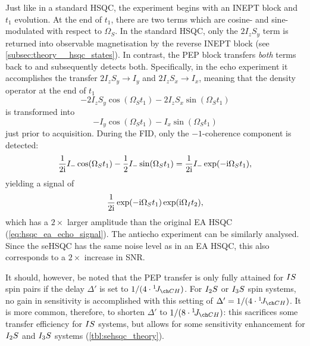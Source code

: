 Just like in a standard HSQC, the experiment begins with an INEPT block and $t_1$ evolution.
At the end of $t_1$, there are two terms which are cosine- and sine-modulated with respect to $\Omega_S$.
In the standard HSQC, only the $2I_zS_y$ term is returned into observable \proton{} magnetisation by the reverse INEPT block (see \cref{subsec:theory__hsqc_states}).
In contrast, the PEP block transfers \textit{both} terms back to \proton{} and subsequently detects both.
Specifically, in the echo experiment it accomplishes the transfer $2I_zS_y \to I_y$ and $2I_zS_x \to I_x$, meaning that the density operator at the end of $t_1$
\begin{equation}
    \label{eq:sehsqc_t1_modulation}
    -2I_zS_y \cos(\Omega_S t_1) - 2I_zS_x \sin(\Omega_S t_1)
\end{equation}
is transformed into
\begin{equation}
    \label{eq:sehsqc_before_detection}
    -I_y \cos(\Omega_S t_1) - I_x \sin(\Omega_S t_1)
\end{equation}
just prior to acquisition.
During the FID, only the $-1$-coherence component is detected:
\begin{equation}
    \label{eq:sehsqc_detection_minusone}
    \frac{1}{2\mathrm{i}}I_- \cos(\Omega_S t_1) - \frac{1}{2}I_- \sin(\Omega_S t_1) = \frac{1}{2\mathrm{i}}I_-\exp(-\mathrm{i} \Omega_S t_1),
\end{equation}
yielding a signal of
\begin{equation}
    \label{eq:s_echo_sehsqc}
    \frac{1}{2\mathrm{i}}\exp(-\mathrm{i} \Omega_S t_1)\exp(\mathrm{i} \Omega_I t_2),
\end{equation}
which has a $2\times$ larger amplitude than the original EA HSQC (\cref{eq:hsqc_ea_echo_signal}).
The antiecho experiment can be similarly analysed.
Since the seHSQC has the same noise level as in an EA HSQC, this also corresponds to a $2\times$ increase in SNR.

It should, however, be noted that the PEP transfer is only fully attained for $IS\/$ spin pairs if the delay $\Delta'$ is set to $1 / (4 \cdot \oneJ{CH})$.
For $I_2S\/$ or $I_3\/S$ spin systems, no gain in sensitivity is accomplished with this setting of $\Delta' = 1 / (4 \cdot \oneJ{CH})$.
It is more common, therefore, to shorten $\Delta'$ to $1 / (8 \cdot \oneJ{CH})$: this sacrifices some transfer efficiency for $IS\/$ systems, but allows for some sensitivity enhancement for $I_2S\/$ and $I_3S\/$ systems (\cref{tbl:sehsqc_theory}).

